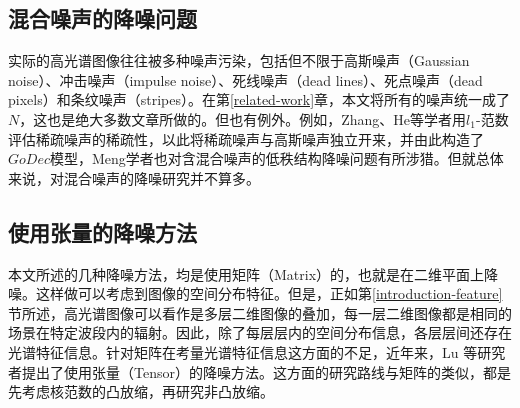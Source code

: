 \documentclass[12pt, a4paper]{article}
\begin{document}
\subsection{混合噪声的降噪问题}
\par 实际的高光谱图像往往被多种噪声污染，包括但不限于高斯噪声（Gaussian noise）、冲击噪声（impulse noise）、死线噪声（dead lines）、死点噪声（dead pixels）和条纹噪声（stripes）\cite{Mixture}。在第\ref{related-work}章，本文将所有的噪声统一成了$N$，这也是绝大多数文章所做的。但也有例外。例如，Zhang、He等学者用$l_1$-范数评估稀疏噪声的稀疏性，以此将稀疏噪声与高斯噪声独立开来，并由此构造了$GoDec$模型\cite{Mixture}，Meng学者也对含混合噪声的低秩结构降噪问题有所涉猎\cite{meng}。但就总体来说，对混合噪声的降噪研究并不算多。
\subsection{使用张量的降噪方法}
\par 本文所述的几种降噪方法，均是使用矩阵（Matrix）的，也就是在二维平面上降噪。这样做可以考虑到图像的空间分布特征。但是，正如第\ref{introduction-feature}节所述，高光谱图像可以看作是多层二维图像的叠加，每一层二维图像都是相同的场景在特定波段内的辐射。因此，除了每层层内的空间分布信息，各层层间还存在光谱特征信息。针对矩阵在考量光谱特征信息这方面的不足，近年来，Lu 等研究者提出了使用张量（Tensor）的降噪方法\cite{Tensor-1}\cite{Tensor-2}\cite{Tensor-3}。这方面的研究路线与矩阵的类似，都是先考虑核范数的凸放缩\cite{Tensor-1}，再研究非凸放缩\cite{Tensor-2}\cite{Tensor-3}。
\end{document}
